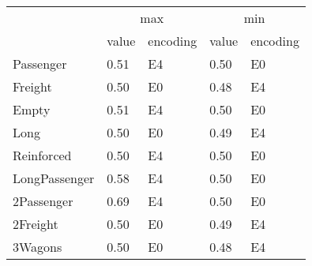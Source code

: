 \begin{tabular}{lllll}
\toprule
 & \multicolumn{2}{c}{max} & \multicolumn{2}{c}{min} \\
 & value & encoding & value & encoding \\
\midrule
Passenger           & 0.51 & E4  & 0.50 & E0  \\
Freight              & 0.50 & E0  & 0.48 & E4  \\
Empty               & 0.51 & E4  & 0.50 & E0  \\
Long                 & 0.50 & E0  & 0.49 & E4  \\
Reinforced          & 0.50 & E4  & 0.50 & E0  \\
LongPassenger       & 0.58 & E4  & 0.50 & E0  \\
2Passenger          & 0.69 & E4  & 0.50 & E0  \\
2Freight             & 0.50 & E0  & 0.49 & E4  \\
3Wagons & 0.50 & E0  & 0.48 & E4  \\
\bottomrule
\end{tabular}
